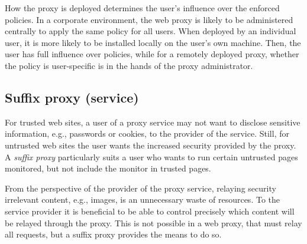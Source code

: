 \documentclass{llncs}
\newcommand{\todo}[1]{\colorbox{red}{\textcolor{white}{\sffamily\bfseries\scriptsize TODO}} \textcolor{red}{#1} \textcolor{red}{$\blacktriangleleft$}}
\begin{document}
How the proxy is 
deployed determines the user's influence over 
the enforced policies.
In a corporate environment, the web proxy is likely to be 
administered centrally to apply the same policy for all users. When deployed by 
an individual user, it is more likely to be installed locally on the user's own machine.
Then, the user has full influence over 
policies, while for a remotely deployed proxy,
whether the policy is user-specific is 
in the hands of the proxy administrator. 




\vspace{-.4cm}
\subsection{Suffix proxy (service)}
\label{sec:arch-suffix}
\vspace{-.2cm}


For trusted web sites, a user of a proxy service may not want to disclose
sensitive information, e.g., passwords or cookies, to the provider of the service.
Still, for untrusted web sites the user wants the increased security provided 
by the proxy.
A \emph{suffix proxy} particularly suits a user who wants to run certain untrusted 
pages monitored, but not include the monitor in trusted pages.

From the perspective of the provider of the proxy service, relaying security irrelevant content, e.g., images, is an 
unnecessary waste of resources. To the service provider it is beneficial to be able to
control precisely which content will be relayed through the proxy. 
This is not possible in a web proxy, that must relay all requests, but a suffix proxy 
provides the means to do so.


\vspace{-.4cm}
\end{document}
